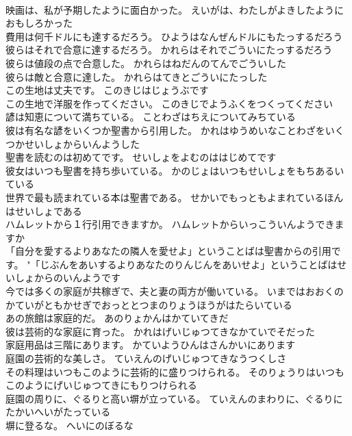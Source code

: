 \documentclass[8pt]{extreport}
\begin{document}
\begin{CJK}{UTF8}{min}
\\	映画は、私が予期したように面白かった。	えいがは、わたしがよきしたようにおもしろかった 
\\	費用は何千ドルにも達するだろう。	ひようはなんぜんドルにもたっするだろう 
\\	彼らはそれで合意に達するだろう。	かれらはそれでごういにたっするだろう 
\\	彼らは値段の点で合意した。	かれらはねだんのてんでごういした 
\\	彼らは敵と合意に達した。	かれらはてきとごういにたっした 
\\	この生地は丈夫です。	このきじはじょうぶです 
\\	この生地で洋服を作ってください。	このきじでようふくをつくってください 
\\	諺は知恵について満ちている。	ことわざはちえについてみちている 
\\	彼は有名な諺をいくつか聖書から引用した。	かれはゆうめいなことわざをいくつかせいしょからいんようした 
\\	聖書を読むのは初めてです。	せいしょをよむのははじめてです 
\\	彼女はいつも聖書を持ち歩いている。	かのじょはいつもせいしょをもちあるいている 
\\	世界で最も読まれている本は聖書である。	せかいでもっともよまれているほんはせいしょである 
\\	ハムレットから１行引用できますか。	ハムレットからいっこういんようできますか 
\\	「自分を愛するよりあなたの隣人を愛せよ」ということばは聖書からの引用です。	"「じぶんをあいするよりあなたのりんじんをあいせよ」ということばはせいしょからのいんようです 
\\	今では多くの家庭が共稼ぎで、夫と妻の両方が働いている。	いまではおおくのかていがともかせぎでおっととつまのりょうほうがはたらいている 
\\	あの旅館は家庭的だ。	あのりょかんはかていてきだ 
\\	彼は芸術的な家庭に育った。	かれはげいじゅつてきなかていでそだった 
\\	家庭用品は三階にあります。	かていようひんはさんかいにあります 
\\	庭園の芸術的な美しさ。	ていえんのげいじゅつてきなうつくしさ 
\\	その料理はいつもこのように芸術的に盛りつけられる。	そのりょうりはいつもこのようにげいじゅつてきにもりつけられる 
\\	庭園の周りに、ぐるりと高い塀が立っている。	ていえんのまわりに、ぐるりにたかいへいがたっている 
\\	塀に登るな。	へいにのぼるな 

\end{CJK}
\end{document}
